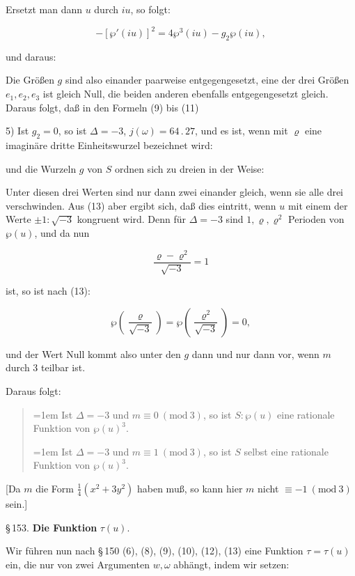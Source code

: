 
Ersetzt man dann $u$ durch $iu$, so folgt:

\[
-[\wp'(iu)]^2 = 4\wp^3(iu) - g_2 \wp(iu),
\]

und daraus:


Die Größen $g$ sind also einander paarweise entgegengesetzt, eine der drei Größen $e_1, e_2, e_3$ ist gleich Null, die beiden anderen ebenfalls entgegengesetzt gleich. Daraus folgt, daß in den Formeln (9) bis (11) 

5) Ist $g_2 = 0$, so ist $\Delta = -3$, $j(\omega) = 64\,.\,27$, und es ist, wenn mit $\varrho$ eine imaginäre dritte Einheitswurzel bezeichnet wird:


und die Wurzeln $g$ von $S$ ordnen sich zu dreien in der Weise:


Unter diesen drei Werten sind nur dann zwei einander gleich, wenn sie alle drei verschwinden. Aus (13) aber ergibt sich, daß dies eintritt, wenn $u$ mit einem der Werte $\pm 1 : \sqrt{-3}$ kongruent wird. Denn für $\Delta = -3$ sind $1, \varrho, \varrho^2$ Perioden von $\wp(u)$, und da nun

\[
\frac{\varrho - \varrho^2}{\sqrt{-3}} = 1
\]

ist, so ist nach (13):

\[
\wp\left(\frac{\varrho}{\sqrt{-3}}\right) = \wp\left(\frac{\varrho^2}{\sqrt{-3}}\right) = 0,
\]

und der Wert Null kommt also unter den $g$ dann und nur dann vor, wenn $m$ durch 3 teilbar ist.

Daraus folgt:

\begin{quote}
\hangindent=1em
Ist $\Delta = -3$ und $m \equiv 0 \ (\mathrm{mod}\ 3)$, so ist $S : \wp(u)$ eine rationale Funktion von $\wp(u)^3$.

\hangindent=1em
Ist $\Delta = -3$ und $m \equiv 1 \ (\mathrm{mod}\ 3)$, so ist $S$ selbst eine rationale Funktion von $\wp(u)^3$.
\end{quote}

[Da $m$ die Form $\frac{1}{4}(x^2 + 3y^2)$ haben muß, so kann hier $m$ nicht $\equiv -1 \ (\mathrm{mod}\ 3)$ sein.]

\begin{center}
§\,153. \textbf{Die Funktion} $\tau(u)$.
\end{center}

Wir führen nun nach §\,150 (6), (8), (9), (10), (12), (13) eine Funktion $\tau = \tau(u)$ ein, die nur von zwei Argumenten $w, \omega$ abhängt, indem wir setzen:
